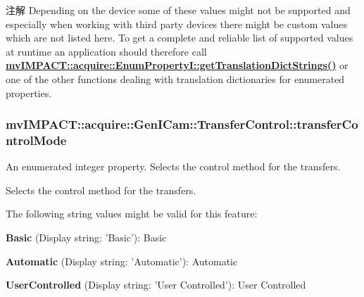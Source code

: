 \begin{DoxyNote}{注解}
Depending on the device some of these values might not be supported and especially when working with third party devices there might be custom values which are not listed here. To get a complete and reliable list of supported values at runtime an application should therefore call {\bfseries \hyperlink{classmv_i_m_p_a_c_t_1_1acquire_1_1_enum_property_i_a0ba6ccbf5ee69784d5d0b537924d26b6}{mv\+I\+M\+P\+A\+C\+T\+::acquire\+::\+Enum\+Property\+I\+::get\+Translation\+Dict\+Strings()}} or one of the other functions dealing with translation dictionaries for enumerated properties. 
\end{DoxyNote}
\hypertarget{classmv_i_m_p_a_c_t_1_1acquire_1_1_gen_i_cam_1_1_transfer_control_a32c443f8d4a281c17a6538b2e369839c}{
\subsubsection[{transfer\+Control\+Mode}]{ mv\+I\+M\+P\+A\+C\+T\+::acquire\+::\+Gen\+I\+Cam\+::\+Transfer\+Control\+::transfer\+Control\+Mode}}\label{classmv_i_m_p_a_c_t_1_1acquire_1_1_gen_i_cam_1_1_transfer_control_a32c443f8d4a281c17a6538b2e369839c}


An enumerated integer property. Selects the control method for the transfers. 

Selects the control method for the transfers.

The following string values might be valid for this feature\+:
\begin{DoxyItemize}
\item {\bfseries Basic} (Display string\+: 'Basic')\+: Basic
\item {\bfseries Automatic} (Display string\+: 'Automatic')\+: Automatic
\item {\bfseries User\+Controlled} (Display string\+: 'User Controlled')\+: User Controlled
\end{DoxyItemize}

